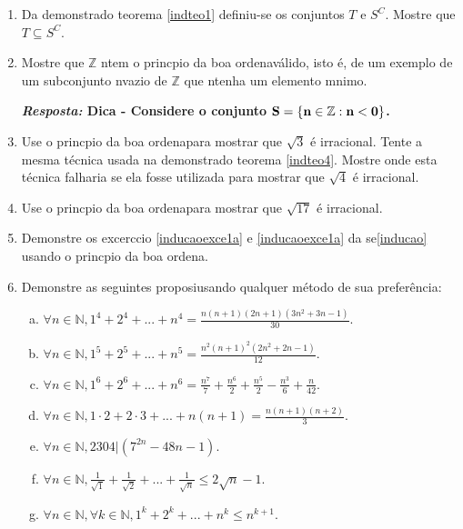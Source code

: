 \begin{enumerate}[{\bf 1.}]

\item Da demonstra\cao do teorema \ref{indteo1} definiu-se os conjuntos $T$ e $S^C$. Mostre que $T\subseteq S^C$.

\item Mostre que $\mathbb{Z}$ n\ao tem o princ\ih pio da boa ordena\cao v\'alido, isto \'e, de um exemplo de um subconjunto n\ao vazio de $\mathbb{Z}$ que n\ao tenha um elemento m\ih nimo.

{\bf{\it Resposta:} Dica - Considere o conjunto ${\bf S=\{n\in\mathbb{Z}: n<0\}}$.}

\item Use o princ\ih pio da boa ordena\cao para mostrar que $\sqrt{3}$ \'e irracional. Tente a mesma t\'ecnica usada na demonstra\cao do teorema \ref{indteo4}. Mostre onde esta t\'ecnica falharia se ela fosse utilizada para mostrar que $\sqrt{4}$ \'e irracional.

\item Use o princ\ih pio da boa ordena\cao para mostrar que $\sqrt{17}$ \'e irracional.

\item Demonstre os excerc\ih cio \ref{inducaoexce1a} e \ref{inducaoexce1a} da se\cao \ref{inducao} usando o princ\ih pio da boa ordena\caoi.

\item Demonstre as seguintes proposi\cois usando qualquer m\'etodo de sua prefer\^encia:
\begin{enumerate}[a)]
\item $\forall n\in\mathbb{N}, 1^4+2^4+...+n^4=\displaystyle\frac{n(n+1)(2n+1)(3n^2+3n-1)}{30}$.
\item $\forall n\in\mathbb{N}, 1^5+2^5+...+n^5=\displaystyle\frac{n^2(n+1)^2(2n^2+2n-1)}{12}$.
\item $\forall n\in\mathbb{N}, 1^6+2^6+...+n^6=\displaystyle\frac{n^7}{7}+\frac{n^6}{2}+\frac{n^5}{2}-\frac{n^3}{6}+\frac{n}{42}$.
\item $\forall n\in\mathbb{N}, 1\cdot 2+ 2\cdot 3+...+n(n+1)=\displaystyle\frac{n(n+1)(n+2)}{3}$.
\item $\forall n\in\mathbb{N}, 2304|(7^{2n}-48n-1)$.
\item $\forall n\in\mathbb{N}, \displaystyle\frac{1}{\sqrt{1}}+\frac{1}{\sqrt{2}}+...+\frac{1}{\sqrt{n}}\leq 2\sqrt{n}-1$.
\item $\forall n\in\mathbb{N}, \forall k\in\mathbb{N}, 1^k+2^k+...+n^k\leq n^{k+1}$.
\end{enumerate}


\end{enumerate}
